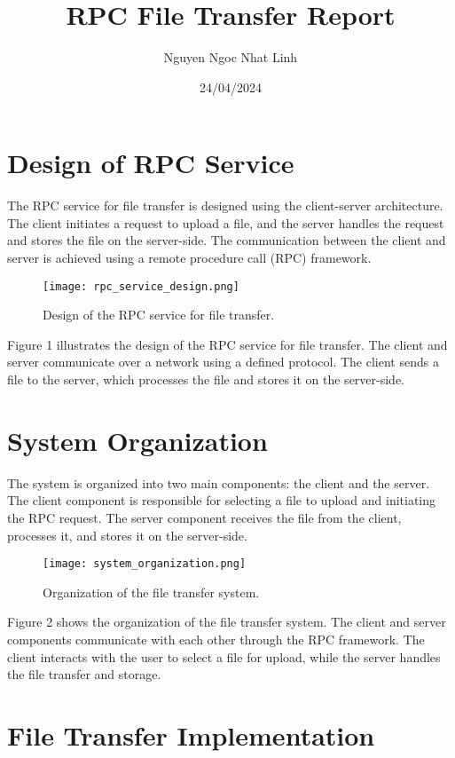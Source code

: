 \documentclass{article}
\begin{document}
\title{RPC File Transfer Report}
\author{Nguyen Ngoc Nhat Linh}
\date{24/04/2024}
\maketitle

\section{Design of RPC Service}

The RPC service for file transfer is designed using the client-server architecture. The client initiates a request to upload a file, and the server handles the request and stores the file on the server-side. The communication between the client and server is achieved using a remote procedure call (RPC) framework.

\begin{figure}[h]
  \centering
  \texttt{[image: rpc\_service\_design.png]}
  \caption{Design of the RPC service for file transfer.}
\end{figure}

Figure 1 illustrates the design of the RPC service for file transfer. The client and server communicate over a network using a defined protocol. The client sends a file to the server, which processes the file and stores it on the server-side.

\section{System Organization}

The system is organized into two main components: the client and the server. The client component is responsible for selecting a file to upload and initiating the RPC request. The server component receives the file from the client, processes it, and stores it on the server-side.

\begin{figure}[h]
  \centering
  \texttt{[image: system\_organization.png]}
  \caption{Organization of the file transfer system.}
\end{figure}

Figure 2 shows the organization of the file transfer system. The client and server components communicate with each other through the RPC framework. The client interacts with the user to select a file for upload, while the server handles the file transfer and storage.

\section{File Transfer Implementation}
\end{document}
